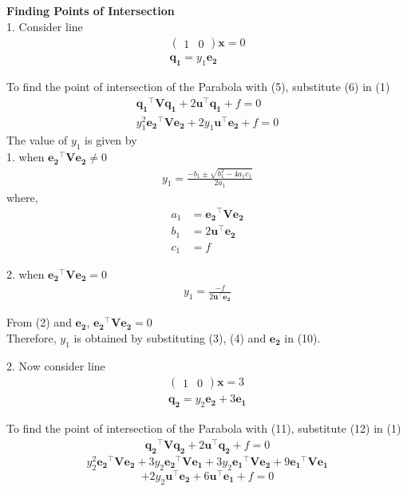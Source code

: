 \documentclass[journal,12pt,twocolumn]{IEEEtran}
\let\vec\mathbf
\begin{document}
\textbf{Finding Points of Intersection}
\vspace{0.2cm}
\\1. Consider line 
\begin{align}
\begin{pmatrix}
 1 & 0
\end{pmatrix} \vec{x} = 0 \\ 
\vec{q_1} = y_1\vec{e_2} 
\end{align}

To find the point of intersection of the Parabola with (5), substitute (6) in (1)
\begin{align}
\vec{q_1}^{\top}\vec{V}\vec{q_1}+2\vec{u}^{\top}\vec{q_1}+f = 0 \\
y_1^2\vec{e_2}^{\top}\vec{V}\vec{e_2}+2y_1\vec{u}^{\top}\vec{e_2}+f = 0 
\end{align}  
The value of $y_1$ is given by \\
\vspace{0.2cm}
1. when $\vec{e_2}^{\top}\vec{V}\vec{e_2} \neq 0 $ 
\begin{align}
y_1=\frac{-b_1 \pm \sqrt{b_1^2-4a_1c_1}}{2a_1} 
\end{align}
where,
\begin{align*}
a_1 & = \vec{e_2}^{\top}\vec{V}\vec{e_2}  \\
b_1 & = 2\vec{u}^{\top}\vec{e_2}  \\
c_1 & = f
\end{align*}

\vspace{0.2cm}
2. when $\vec{e_2}^{\top}\vec{V}\vec{e_2} = 0 $ 
\begin{align}
y_1=\frac{-f}{2\vec{u}^{\top}\vec{e_2}} 
\end{align} 

From (2) and $\vec{e_2}$, $\vec{e_2}^{\top}\vec{V}\vec{e_2} = 0 $ \\
Therefore, $y_1$ is obtained by substituting (3), (4) and $\vec{e_2}$ in (10).

\vspace{0.4cm}
2. Now consider line 
\begin{align}
\begin{pmatrix}
 1 & 0
\end{pmatrix} \vec{x} = 3 \\
\vec{q_2} = y_2\vec{e_2}+3\vec{e_1}
\end{align}

To find the point of intersection of the Parabola with (11), substitute (12) in (1)
\begin{align}
\vec{q_2}^{\top}\vec{V}\vec{q_2}+2\vec{u}^{\top}\vec{q_2}+f = 0 
\end{align}
\begin{equation*}
y_2^2\vec{e_2}^{\top}\vec{V}\vec{e_2}+3y_2\vec{e_2}^{\top}\vec{V}\vec{e_1}+3y_2\vec{e_1}^{\top}\vec{V}\vec{e_2}+9\vec{e_1}^{\top}\vec{V}\vec{e_1}
\end{equation*}
\begin{equation}
+2y_2\vec{u}^{\top}\vec{e_2}+6\vec{u}^{\top}\vec{e_1}+f = 0 
\end{equation}
\end{document}
